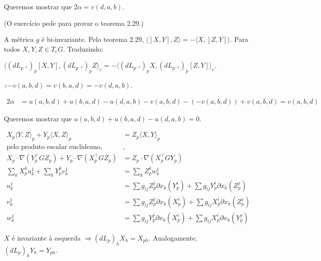 \documentclass[12pt]{article}
\begin{document}
		Queremos mostrar que $2\alpha = v(d, a, b)$.

		(O exerc\'icio pede para provar o teorema 2.29.)

		A m\'etrica $g$ \'e bi-invariante. Pelo teorema 2.29, $\langle [X, Y], Z \rangle = - \langle X, [Z, Y] \rangle$. Para todos $X, Y, Z \in T_eG$. Traduzindo:

		$\langle (dL_{p^{-1}})_p [X,Y], (dL_{p^{-1}})_p Z \rangle_e = - \langle (dL_{p^{-1}})_p X, (dL_{p^{-1}})_p [Z,Y] \rangle_e$.

		$\therefore - v(a,b,d) = v(b,a,d) = -v(d,a,b)$.

		\begin{align}
		2 \alpha &= u(a,b,d) + u(b,a,d) - u(d,a,b) - v(a,b,d) - (- v(a,b,d)) + v(a,b,d) = v(a, b, d)
		\end{align}

		Queremos mostrar que $u(a,b,d) + u(b,a,d) - u(d,a,b) = 0$.

		\begin{align}
		X_p \langle Y, Z \rangle_p + Y_p \langle X, Z \rangle_p &= Z_p \langle X, Y \rangle_p \\
		\text{pelo produto escalar euclideano,}&, \\
		X_p \cdot \nabla (Y^\top_p G Z_p) + Y_p \cdot \nabla (X^\top_p G Z_p) &= Z_p \cdot \nabla (X^\top_p G Y_p) \\
		\sum_k X_p^k u_k^1 + \sum_k Y_p^k v_k^1 &= \sum_k Z_p^k w_k^1 \\
		u_k^1 &= \sum g_{ij} Z^j_p \partial x_k (Y^i_p) + \sum g_{ij} Y^i_p \partial x_k (Z^j_p) \\
		v_k^1 &= \sum g_{ij} Z^j_p \partial x_k (X^i_p) + \sum g_{ij} X^i_p \partial x_k (Z^j_p) \\
		w_k^1 &= \sum g_{ij} Y^j_p \partial x_k (X^i_p) + \sum g_{ij} X^i_p \partial x_k (Y^j_p)
		\end{align}

		\vspace{3mm}

		$X$ \'e invariante \`a esquerda $\Rightarrow (dL_p)_h X_h = X_{ph}$. Analogamente, $(dL_p)_h Y_h = Y_{ph}$.
\end{document}
